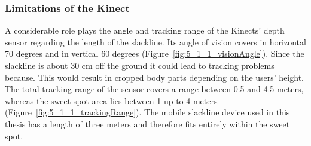 \subsubsection{Limitations of the Kinect} 
A considerable role plays the angle and tracking range of the Kinects' depth sensor regarding the length of the slackline. Its angle of vision covers in horizontal 70 degrees and in vertical 60 degrees (Figure~\ref{fig:5_1_1_visionAngle}). Since the slackline is about 30 cm off the ground it could lead to tracking problems because. This would result in cropped body parts depending on the users' height. The total tracking range of the sensor covers a range between 0.5 and 4.5 meters, whereas the sweet spot area lies between 1 up to 4 meters~\cite{MicrosoftHIG2014-mh} (Figure~\ref{fig:5_1_1_trackingRange}). The mobile slackline device used in this thesis has a length of three meters and therefore fits entirely within the sweet spot.
